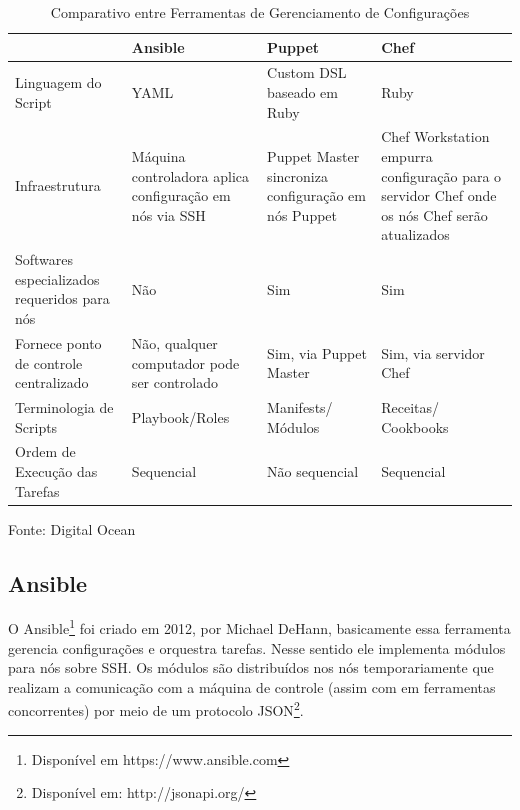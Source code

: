 \begin{table}[h]
	\centering

	\begin{tabular}{|p{3.0cm}|p{3.0cm}|p{3.0cm}|p{3.0cm}|}
		\cline{1-4}
		
		  & Ansible &Puppet & Chef \\ %
		\hline                               %
		Linguagem do Script & YAML        & Custom DSL baseado em Ruby & Ruby\\ \cline{1-4}
		
		Infraestrutura & Máquina controladora aplica configuração em nós via SSH  & Puppet Master sincroniza configuração em nós Puppet & Chef Workstation empurra configuração para o servidor Chef onde os nós Chef serão atualizados  \\ \cline{1-4}
		
		Softwares especializados requeridos para nós & Não & Sim & Sim\\ \cline{1-4}
		
		Fornece ponto de controle centralizado & Não, qualquer computador pode ser controlado &  Sim, via  Puppet Master & Sim, via servidor Chef \\ \cline{1-4}
		
		Terminologia de Scripts & Playbook/Roles & Manifests/ Módulos & Receitas/ Cookbooks \\ \cline{1-4}
		
		Ordem de Execução das Tarefas & Sequencial & Não sequencial & Sequencial \\ \cline{1-4}         
		
	\end{tabular}
	\caption{Comparativo entre Ferramentas de Gerenciamento de Configurações}
	\label{tab:tabelacomparativa1}
	Fonte: Digital Ocean\footnotemark
\end{table}


\subsection{Ansible}

O Ansible\footnote{Disponível em https://www.ansible.com} foi criado em 2012, por Michael DeHann, basicamente essa ferramenta gerencia configurações e orquestra tarefas. Nesse sentido ele implementa módulos para nós sobre SSH. Os módulos são distribuídos nos nós temporariamente que realizam a comunicação com a máquina de controle (assim com em ferramentas concorrentes) por meio de um protocolo JSON\footnote{Disponível em: http://jsonapi.org/}.\cite{imhofsurvey}


